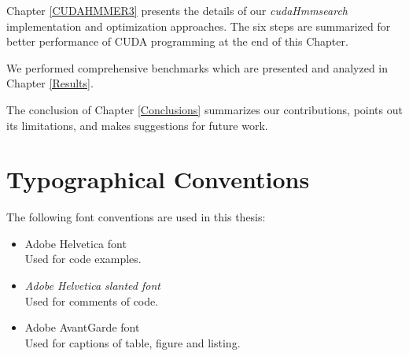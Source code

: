 Chapter \ref{CUDAHMMER3} presents the details of our \emph{cudaHmmsearch} implementation and optimization approaches. The six steps are summarized for better performance of CUDA programming at the end of this Chapter.

We performed comprehensive benchmarks which are presented and analyzed in Chapter \ref{Results}. 

The conclusion of Chapter \ref{Conclusions} summarizes our contributions, points out its limitations, and makes suggestions for future work.

\section{Typographical Conventions}
The following font conventions are used in this thesis:
\begin{itemize}
 \item {\selectfont Adobe Helvetica font}\\
 Used for code examples.
 \item {\selectfont \textsl{Adobe Helvetica slanted font}}\\
 Used for comments of code.
 \item {\selectfont Adobe AvantGarde font}\\
 Used for captions of table, figure and listing.
\end{itemize}
